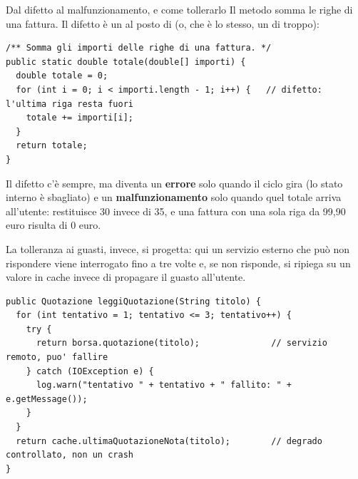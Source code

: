 \begin{esempio}{Dal difetto al malfunzionamento, e come tollerarlo}
Il metodo somma le righe di una fattura. Il difetto è un \code{<} al posto di \code{<=} (o, che è lo stesso, un
 di troppo):
\begin{lstlisting}[style=java, name=Fattura.java]
/** Somma gli importi delle righe di una fattura. */
public static double totale(double[] importi) {
  double totale = 0;
  for (int i = 0; i < importi.length - 1; i++) {   // difetto: l'ultima riga resta fuori
    totale += importi[i];
  }
  return totale;
}
\end{lstlisting}
Il difetto c'è sempre, ma diventa un \textbf{errore} solo quando il ciclo gira (lo stato interno  è
sbagliato) e un \textbf{malfunzionamento} solo quando quel totale arriva all'utente: 
restituisce 30 invece di 35, e una fattura con una sola riga da 99,90 euro risulta di 0 euro.

La tolleranza ai guasti, invece, si progetta: qui un servizio esterno che può non rispondere viene interrogato fino a tre
volte e, se non risponde, si ripiega su un valore in cache invece di propagare il guasto all'utente.
\begin{lstlisting}[style=java, name=ServizioQuotazioni.java]
public Quotazione leggiQuotazione(String titolo) {
  for (int tentativo = 1; tentativo <= 3; tentativo++) {
    try {
      return borsa.quotazione(titolo);              // servizio remoto, puo' fallire
    } catch (IOException e) {
      log.warn("tentativo " + tentativo + " fallito: " + e.getMessage());
    }
  }
  return cache.ultimaQuotazioneNota(titolo);        // degrado controllato, non un crash
}
\end{lstlisting}
\end{esempio}



